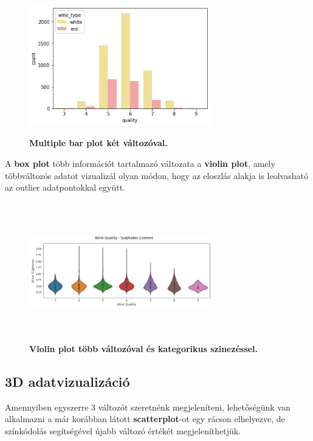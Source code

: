 \documentclass[12pt]{article}
\theoremstyle{plain}
\begin{document}
\begin{figure}[H]
   \centering
   \includegraphics[width=8cm, height=6cm]{media/multiplabar.png}
   \caption{\textbf{Multiple bar plot két változóval.}}
   \label{fig:GeneralDiagram}
\end{figure}

A \textbf{box plot} több információt tartalmazó változata a \textbf{violin plot}, amely többváltozós adatot vizualizál olyan módon, hogy az eloszlás alakja is leolvasható az outlier adatpontokkal együtt.


\begin{figure}[H]
   \centering
   \includegraphics[width=8cm, height=6cm]{media/violin.png}
   \caption{\textbf{Violin plot több változóval és kategorikus szinezéssel.}}
   \label{fig:GeneralDiagram}
\end{figure}


\subsection{3D adatvizualizáció}
Amennyiben egyszerre 3 változót szeretnénk megjeleníteni, lehetőségünk van alkalmazni a már korábban látott \textbf{scatterplot}-ot egy rácson elhelyezve, de színkódolás segítségével újabb változó értékét megjeleníthetjük.
\end{document}
